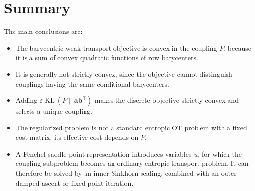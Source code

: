 \documentclass[11pt]{article}
\newcommand{\KL}{\operatorname{KL}}
\begin{document}
\section{Summary}

The main conclusions are:
\begin{itemize}
    \item The barycentric weak transport objective is convex in the coupling
    $P$, because it is a sum of convex quadratic functions of row
    barycenters.
    \item It is generally not strictly convex, since the objective cannot
    distinguish couplings having the same conditional barycenters.
    \item Adding $\varepsilon\KL(P\|\bm{a}\bm{b}^{\top})$ makes the discrete
    objective strictly convex and selects a unique coupling.
    \item The regularized problem is not a standard entropic OT problem with
    a fixed cost matrix: its effective cost depends on $P$.
    \item A Fenchel saddle-point representation introduces variables $u_i$
    for which the coupling subproblem becomes an ordinary entropic transport
    problem. It can therefore be solved by an inner Sinkhorn scaling,
    combined with an outer damped ascent or fixed-point iteration.
\end{itemize}
\end{document}
